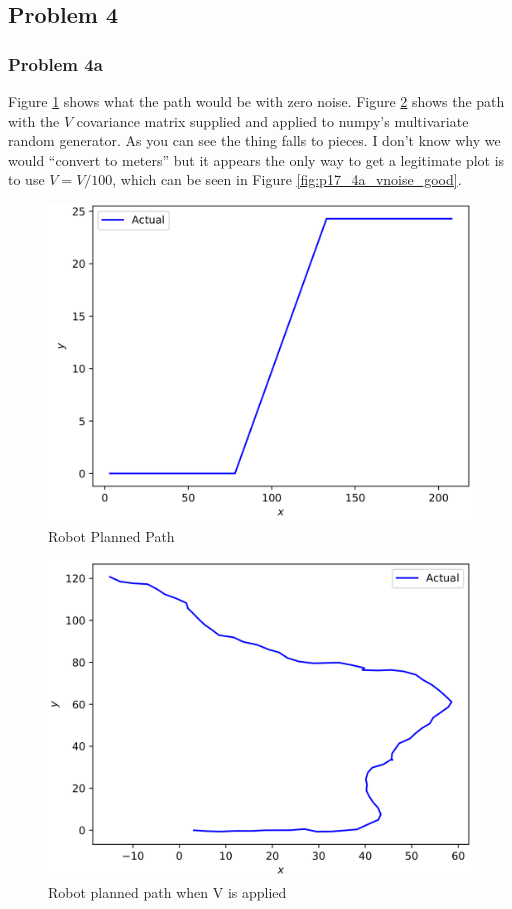 \documentclass{article}
\begin{document}
\newpage
\subsection{Problem 4}
\subsubsection{Problem 4a}
Figure \ref{fig:p17_4a_planned} shows what the path would be with zero noise. 
Figure \ref{fig:p17_4a_vnoise_bad} shows the path with the $V$ covariance 
matrix supplied and applied to numpy's multivariate random generator. As you can 
see the thing falls to pieces. I don't know why we would ``convert to meters'' 
but it appears the only way to get a legitimate plot is to use $V = V / 100$, 
which can be seen in Figure \ref{fig:p17_4a_vnoise_good}.

\begin{figure}[h]
    \centering
    \includegraphics[scale=0.75]{problem17_4a_pure}
    \caption{Robot Planned Path}
    \label{fig:p17_4a_planned}
\end{figure}

\begin{figure}[h]
    \centering
    \includegraphics[scale=0.75]{problem17_4a_Vnoise_bad}
    \caption[Robot Planned Path (bad)]{Robot planned path when V is applied}
    \label{fig:p17_4a_vnoise_bad}
\end{figure}
\end{document}
